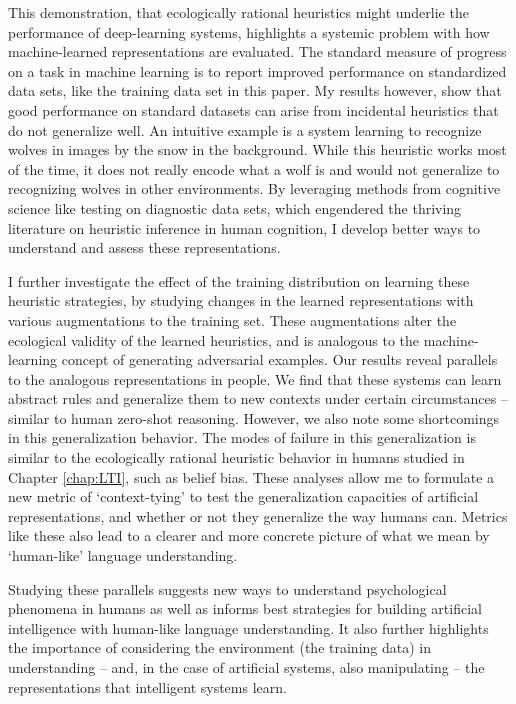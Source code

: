 This demonstration, that ecologically rational heuristics might underlie the performance of deep-learning systems, highlights a systemic problem with how machine-learned representations are evaluated. The standard measure of progress on a task in machine learning is to report improved performance on standardized data sets, like the training data set in this paper. My results however, show that good performance on standard datasets can arise from incidental heuristics that do not generalize well. An intuitive example is a system learning to recognize wolves in images by the snow in the background. While this heuristic works most of the time, it does not really encode what a wolf is and would not generalize to recognizing wolves in other environments. By leveraging methods from cognitive science like testing on diagnostic data sets, which engendered the thriving literature on heuristic inference in human cognition, I develop better ways to understand and assess these representations.

I further investigate the effect of the training distribution on learning these heuristic strategies, by studying changes in the learned representations with various augmentations to the training set. These augmentations alter the ecological validity of the learned heuristics, and is analogous to the machine-learning concept of generating adversarial examples. \cite{goodfellow2014explaining} Our results reveal parallels to the analogous representations in people. We find that these systems can learn abstract rules and generalize them to new contexts under certain circumstances -- similar to human zero-shot reasoning. However, we also note some shortcomings in this generalization behavior. The modes of failure in this generalization is similar to the ecologically rational heuristic behavior in humans studied in Chapter \ref{chap:LTI}, such as belief bias. These analyses allow me to formulate a new metric of `context-tying' to test the generalization capacities of artificial representations, and whether or not they generalize the way humans can. Metrics like these also lead to a clearer and more concrete picture of what we mean by `human-like' language understanding. 

Studying these parallels suggests new ways to understand psychological phenomena in humans as well as informs best strategies for building artificial intelligence with human-like language understanding. It also further highlights the importance of considering the environment (the training data) in understanding – and, in the case of artificial systems, also manipulating – the representations that intelligent systems learn. 

